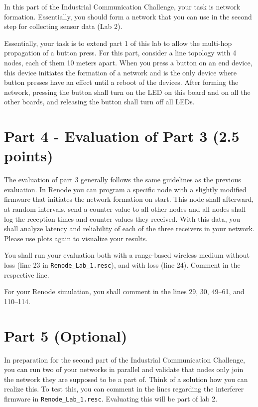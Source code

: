 \documentclass[11pt]{article}
\begin{document}
In this part of the Industrial Communication Challenge, your task is network formation. Essentially, you should form a network that you can use in the second step for collecting sensor data (Lab 2).

Essentially, your task is to extend part 1 of this lab to allow the multi-hop propagation of a button press. For this part, consider a line topology with 4 nodes, each of them 10 meters apart. When you press a button on an end device, this device initiates the formation of a network and is the only device where button presses have an effect until a reboot of the devices. After forming the network, pressing the button shall turn on the LED on this board and on all the other boards, and releasing the button shall turn off all LEDs.

\section*{Part 4 - Evaluation of Part 3 (2.5 points)}

The evaluation of part 3 generally follows the same guidelines as the previous evaluation. In Renode you can program a specific node with a slightly modified firmware that initiates the network formation on start. This node shall afterward, at random intervals, send a counter value to all other nodes and all nodes shall log the reception times and counter values they received. With this data, you shall analyze latency and reliability of each of the three receivers in your network. Please use plots again to visualize your results.

\clearpage

You shall run your evaluation both with a range-based wireless medium without loss (line 23 in \texttt{Renode\_Lab\_1.resc}), and with loss (line 24). Comment in the respective line.

For your Renode simulation, you shall comment in the lines 29, 30, 49–61, and 110–114.

\section*{Part 5 (Optional)}

In preparation for the second part of the Industrial Communication Challenge, you can run two of your networks in parallel and validate that nodes only join the network they are supposed to be a part of. Think of a solution how you can realize this. To test this, you can comment in the lines regarding the interferer firmware in \texttt{Renode\_Lab\_1.resc}. Evaluating this will be part of lab 2.
\end{document}
